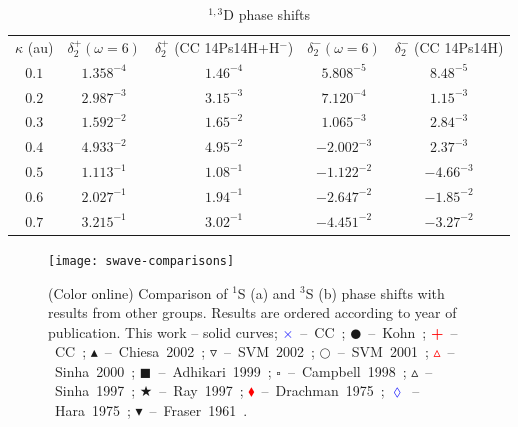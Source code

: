 \documentclass[preprint,showpacs,preprintnumbers,amsmath,amssymb]{revtex4}
\begin{document}
\begin{table}[H]
\begin{center}
\begin{ruledtabular}
\begin{tabular}{c c c c c}
$\kappa$ (au) & $\delta_2^+ (\omega = 6)$ & $\delta_2^+$ (CC 14Ps14H+H$^-$) \cite{Walters2004} & $\delta_2^- (\omega = 6)$ & $\delta_2^-$ (CC 14Ps14H) \cite{Blackwood2002} \\
\colrule
$0.1$ & $1.358^{-4}$ & $1.46^{-4}$ & $5.808^{-5}$ & $8.48^{-5}$ \\
$0.2$ & $2.987^{-3}$ & $3.15^{-3}$ & $7.120^{-4}$ & $1.15^{-3}$ \\
$0.3$ & $1.592^{-2}$ & $1.65^{-2}$ & $1.065^{-3}$ & $2.84^{-3}$ \\
$0.4$ & $4.933^{-2}$ & $4.95^{-2}$ & $-2.002^{-3}$ & $2.37^{-3}$ \\
$0.5$ & $1.113^{-1}$ & $1.08^{-1}$ & $-1.122^{-2}$ & $-4.66^{-3}$ \\
$0.6$ & $2.027^{-1}$ & $1.94^{-1}$ & $-2.647^{-2}$ & $-1.85^{-2}$ \\
$0.7$ & $3.215^{-1}$ & $3.02^{-1}$ & $-4.451^{-2}$ & $-3.27^{-2}$ \\
\end{tabular}
\end{ruledtabular}
\caption{$^{1,3}$D phase shifts}
\label{tab:DWavePhase}
\end{center}
\end{table}



\begin{figure}[H]
	\centering
	\texttt{[image: swave-comparisons]}
	\caption{(Color online) Comparison of $^1$S (a) and $^3$S (b) phase shifts with results from other groups. Results are ordered according to year of publication. This work -- solid curves; \mbox{\textcolor{blue}{$\times$} -- CC \cite{Walters2004};} \mbox{$\CIRCLE$ -- Kohn \cite{VanReeth2003};} \mbox{\textcolor{red}{\textbf{+}} -- CC \cite{Blackwood2002};} \mbox{$\blacktriangle$ -- Chiesa 2002 \cite{Chiesa2002};} \mbox{$\triangledown$ -- SVM 2002 \cite{Ivanov2002};} \mbox{$\Circle$ -- SVM 2001 \cite{Ivanov2001};} \mbox{\textcolor{red}{$\vartriangle$} -- Sinha 2000 \cite{Sinha2000};} \mbox{$\blacksquare$ -- Adhikari 1999 \cite{Adhikari1999};} \mbox{$\square$ -- Campbell 1998 \cite{Campbell1998};} \mbox{$\vartriangle$ -- Sinha 1997 \cite{Sinha1997};} \mbox{\textcolor[RGB]{0,127,0}{$\bigstar$} -- Ray 1997 \cite{Ray1997};} \mbox{\textcolor{red}{$\blacklozenge$} -- Drachman 1975 \cite{Drachman1975};} \mbox{\textcolor{blue}{$\lozenge$} -- Hara 1975 \cite{Hara1975};} \mbox{$\blacktriangledown$ -- Fraser 1961 \cite{Fraser1961}.}}
	\label{fig:swave-comparisons}
\end{figure}
\end{document}
